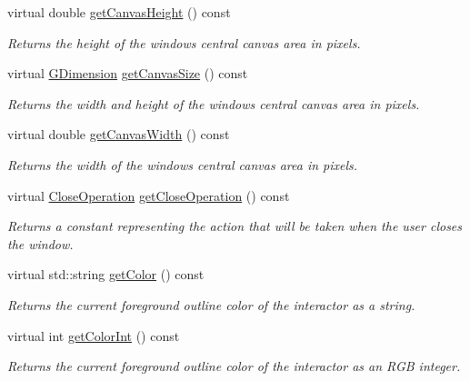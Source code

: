 \begin{DoxyCompactItemize}
virtual double \mbox{\hyperlink{classGWindow_abd8bb28e2ac85d1b474db3f17f65115e}{get\+Canvas\+Height}} () const
\begin{DoxyCompactList}\small\item\em Returns the height of the window\textquotesingle{}s central canvas area in pixels. \end{DoxyCompactList}\item 
virtual \mbox{\hyperlink{classGDimension}{G\+Dimension}} \mbox{\hyperlink{classGWindow_a7d095192cefa2d9acf8fcf1cd00386c4}{get\+Canvas\+Size}} () const
\begin{DoxyCompactList}\small\item\em Returns the width and height of the window\textquotesingle{}s central canvas area in pixels. \end{DoxyCompactList}\item 
virtual double \mbox{\hyperlink{classGWindow_a82ed6884fd4b0257a825e786236c2428}{get\+Canvas\+Width}} () const
\begin{DoxyCompactList}\small\item\em Returns the width of the window\textquotesingle{}s central canvas area in pixels. \end{DoxyCompactList}\item 
virtual \mbox{\hyperlink{classGWindow_a84803201f0f9569db61f51cac9e0d2d2}{Close\+Operation}} \mbox{\hyperlink{classGWindow_a733b18ceeceb7ab98da8c4ac9a8d2857}{get\+Close\+Operation}} () const
\begin{DoxyCompactList}\small\item\em Returns a constant representing the action that will be taken when the user closes the window. \end{DoxyCompactList}\item 
virtual std\+::string \mbox{\hyperlink{classGDrawingSurface_aa061dfa488c31e18549d64363c1d0e34}{get\+Color}} () const
\begin{DoxyCompactList}\small\item\em Returns the current foreground outline color of the interactor as a string. \end{DoxyCompactList}\item 
virtual int \mbox{\hyperlink{classGDrawingSurface_a9635c7af766cdc3417f346683fa0e6c1}{get\+Color\+Int}} () const
\begin{DoxyCompactList}\small\item\em Returns the current foreground outline color of the interactor as an R\+GB integer. \end{DoxyCompactList}\item 

\end{DoxyCompactItemize}
